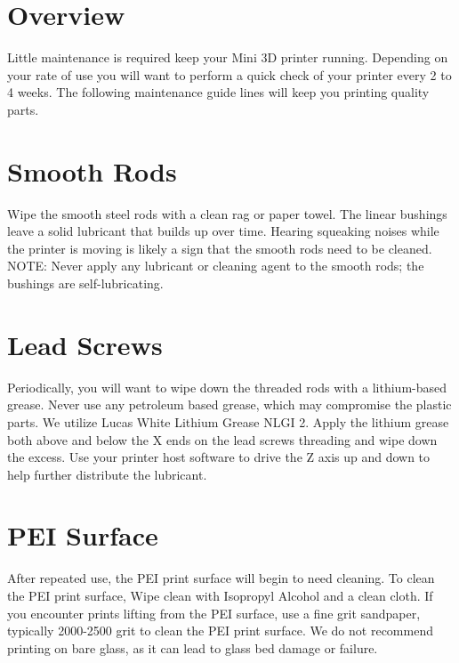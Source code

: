 %
%
%
%
%

\section{Overview}
Little maintenance is required keep your Mini 3D printer running. Depending on your rate of use you will want to perform a quick check of your printer every 2 to 4 weeks. The following maintenance guide lines will keep you printing quality parts.

\section{Smooth Rods}
Wipe the smooth steel rods with a clean rag or paper towel. The linear bushings leave a solid lubricant that builds up over time. Hearing squeaking noises while the printer is moving is likely a sign that the smooth rods need to be cleaned. NOTE: Never apply any lubricant or cleaning agent to the smooth rods; the bushings are self-lubricating.

\section{Lead Screws}
Periodically, you will want to wipe down the threaded rods with a lithium-based grease. Never use any petroleum based grease, which may compromise the plastic parts. We utilize Lucas White Lithium Grease NLGI 2. Apply the lithium grease both above and below the X ends on the lead screws threading and wipe down the excess. Use your printer host software to drive the Z axis up and down to help further distribute the lubricant.

\section{PEI Surface}
After repeated use, the PEI print surface will begin to need cleaning. To clean the PEI print surface, Wipe clean with Isopropyl Alcohol and a clean cloth. If you encounter prints lifting from the PEI surface, use a fine grit sandpaper, typically 2000-2500 grit to clean the PEI print surface. We do not recommend printing on bare glass, as it can lead to glass bed damage or failure.

